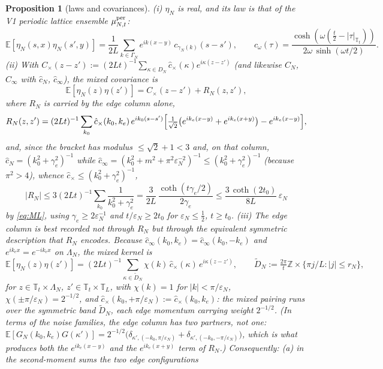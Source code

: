 \documentclass[11pt,a4paper]{article}
\theoremstyle{plain}
\newtheorem{proposition}[theorem]{Proposition}
\theoremstyle{definition}
\newcommand{\Z}{\mathbb{Z}}
\newcommand{\T}{\mathbb{T}}
\newcommand{\E}{\mathbb{E}}
\newcommand{\eps}{\varepsilon}
\DeclareMathOperator{\cth}{coth}
\DeclareMathOperator{\sh}{sinh}
\begin{document}
\begin{proposition}[laws and covariances]\label{prop:laws}
\emph{(i)} $\eta_N$ is real, and its law is that of the V1 periodic lattice
ensemble $\mu^{\rm per}_{N,t}$:
\[
 \E[\eta_N(s,x)\eta_N(s',y)]
 =\frac1{2L}\sum_{k\in\Gamma_N}e^{ik(x-y)}\,c_{\gamma_N(k)}(s-s'),
 \qquad
 c_\omega(\tau)=\frac{\cosh(\omega(\tfrac t2-|\tau|_{\T_t}))}
 {2\omega\,\sh(\omega t/2)} .
\]
\emph{(ii)} With $C_\times(z-z'):=(2Lt)^{-1}\sum_{\kappa\in D_N}
\hat c_\times(\kappa)e^{i\kappa(z-z')}$ (and likewise $C_N$, $C_\infty$ with
$\hat c_N$, $\hat c_\infty$), the mixed covariance is
\[
 \E[\eta_N(z)\eta(z')]=C_\times(z-z')+R_N(z,z'),
\]
where $R_N$ is carried by the edge column alone,
\[
 R_N(z,z')=(2Lt)^{-1}\sum_{k_0}\hat c_\times(k_0,k_e)\,e^{ik_0(s-s')}
 \Bigl[\tfrac1{\sqrt2}\bigl(e^{ik_e(x-y)}+e^{ik_e(x+y)}\bigr)-e^{ik_e(x-y)}\Bigr],
\]
and, since the bracket has modulus $\le\sqrt2+1<3$ and, on that column,
$\hat c_N=(k_0^2+\gamma_e^2)^{-1}$ while
$\hat c_\infty=(k_0^2+m^2+\pi^2\eps_N^{-2})^{-1}\le(k_0^2+\gamma_e^2)^{-1}$
(because $\pi^2>4$), whence $\hat c_\times\le(k_0^2+\gamma_e^2)^{-1}$,
\[
 |R_N|\le3(2Lt)^{-1}\!\sum_{k_0}\frac1{k_0^2+\gamma_e^2}
 =\frac3{2L}\,\frac{\cth(t\gamma_e/2)}{2\gamma_e}
 \le\frac{3\,\cth(2t_0)}{8L}\,\eps_N
\]
by \eqref{eq:ML}, using $\gamma_e\ge2\eps_N^{-1}$ and $t/\eps_N\ge2t_0$ for
$\eps_N\le\tfrac12$, $t\ge t_0$.
\emph{(iii)} The edge column is best recorded not through $R_N$ but through the
equivalent \emph{symmetric} description that $R_N$ encodes. Because
$\hat c_\infty(k_0,k_e)=\hat c_\infty(k_0,-k_e)$ and
$e^{ik_ex}=e^{-ik_ex}$ on $\Lambda_N$, the mixed kernel is
\begin{equation*}
 \E[\eta_N(z)\eta(z')]
 =(2Lt)^{-1}\!\!\sum_{\kappa\in\tilde D_N}\!\!
 \chi(k)\,\hat c_\times(\kappa)\,e^{i\kappa(z-z')},
 \qquad
 \tilde D_N:=\tfrac{2\pi}t\Z\times\{\pi j/L:|j|\le r_N\},
\end{equation*}
for $z\in\T_t\times\Lambda_N$, $z'\in\T_t\times\T_L$, with $\chi(k)=1$ for
$|k|<\pi/\eps_N$, $\chi(\pm\pi/\eps_N)=2^{-1/2}$, and
$\hat c_\times(k_0,+\pi/\eps_N):=\hat c_\times(k_0,k_e)$: the mixed pairing runs over
the \emph{symmetric} band $\tilde D_N$, each edge momentum carrying weight $2^{-1/2}$.
(In terms of the noise families, the edge column has \emph{two} partners, not one:
$\E[G_N(k_0,k_e)G(\kappa')]
=2^{-1/2}\bigl(\delta_{\kappa',(-k_0,\pi/\eps_N)}+\delta_{\kappa',(-k_0,-\pi/\eps_N)}\bigr)$,
which is what produces both the $e^{ik_e(x-y)}$ and the $e^{ik_e(x+y)}$ term of $R_N$.)
Consequently:
\emph{(a)} in the second-moment sums the two edge configurations

\end{proposition}
\end{document}
